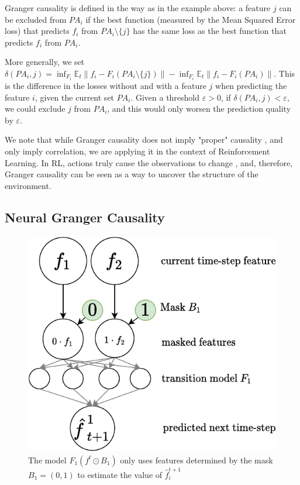 \documentclass[a4paper,11pt,oneside]{report}
\begin{document}
Granger causality \cite{Barnett2015} is defined in the way as in the example above: a feature $j$ can be excluded from $PA_i$ if the best function (measured by the Mean Squared Error loss) that predicts $f_i$ from $PA_i\setminus\{j\}$ has the same loss as the best function that predicts $f_i$ from $PA_i$.

More generally, we set $\delta(PA_i,j)=\inf_{F_i}\mathbb E_t\|f_i-F_i(PA_i\setminus\{j\})\|-\inf_{F_i}\mathbb E_t\|f_i-F_i(PA_i)\|$. This is the difference in the losses without and with a feature $j$ when predicting the feature $i$, given the current set $PA_i$.
Given a threshold $\varepsilon>0$, if $\delta(PA_i,j)<\varepsilon$, we could exclude $j$ from $PA_i$, and this would only worsen the prediction quality by $\varepsilon$.

We note that while Granger causality does not imply "proper" causality \cite{Pearl2020}, and only imply correlation, we are applying it in the context of Reinforcement Learning. In RL, actions truly cause the observations to change \cite{rezende2020causally}, and, therefore, Granger causality can be seen as a way to uncover the structure of the environment.

\subsection{Neural Granger Causality}
\label{subsec:neural_granger}
\begin{figure}
    \centering
    \includegraphics[width=0.7\linewidth]{diagrams/feature_mask_feature}
    \caption{The model $F_1(f^t\odot B_1)$ only uses features determined by the mask $B_1=(0,1)$ to estimate the value of $\hat{f}_i^{t+1}$}
    \label{fig:featuremaskfeature}
\end{figure}
\end{document}
